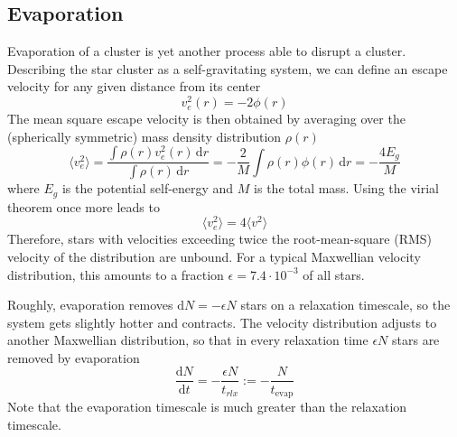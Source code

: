 \subsection{Evaporation}
Evaporation of a cluster is yet another process able to disrupt a cluster. Describing the star cluster as a self-gravitating system, we can define an escape velocity for any given distance from its center 
\begin{equation*}
    v^{2}_{e}(r) = -2\phi(r)
\end{equation*}
The mean square escape velocity is then obtained by averaging over the (spherically symmetric) mass density distribution $\rho(r)$
\begin{equation*}
    \langle v^{2}_{e}\rangle = \frac{\int \rho(r)v^{2}_{e}(r)\,\text{d}r}{\int \rho(r)\,\text{d}r} = -\frac{2}{M}\int \rho(r)\phi(r)\,\text{d}r = -\frac{4E_{g}}{M}
\end{equation*}
where $E_{g}$ is the potential self-energy and $M$ is the total mass. Using the virial theorem once more leads to 
\begin{equation*}
    \langle v^{2}_{e}\rangle = 4\langle v^{2}\rangle
\end{equation*}
Therefore, stars with velocities exceeding twice the root-mean-square (RMS) velocity of the distribution are unbound. For a typical Maxwellian velocity distribution, this amounts to a fraction $\epsilon = 7.4\cdot 10^{-3}$ of all stars.
\par Roughly, evaporation removes $\text{d}N = -\epsilon N$ stars on a relaxation timescale, so the system gets slightly hotter and contracts. The velocity distribution adjusts to another Maxwellian distribution, so that in every relaxation time $\epsilon N$ stars are removed by evaporation
\begin{equation}
    \frac{\text{d}N}{\text{d}t} = -\frac{\epsilon N}{t_{rlx}} := -\frac{N}{t_{\text{evap}}}
    \label{eq:evaporation_ts}
\end{equation}
Note that the evaporation timescale is much greater than the relaxation timescale.

